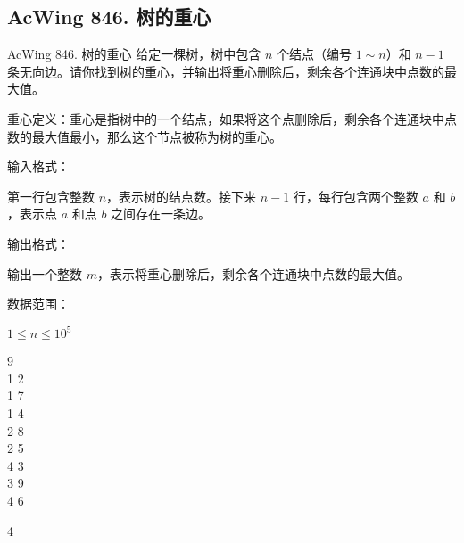 \subsection{AcWing 846. 树的重心}
\begin{titledbox}{AcWing 846. 树的重心}
    给定一棵树，树中包含 $n$ 个结点（编号 $1 \sim n$）和 $n-1$ 条无向边。请你找到树的重心，并输出将重心删除后，剩余各个连通块中点数的最大值。

    重心定义：重心是指树中的一个结点，如果将这个点删除后，剩余各个连通块中点数的最大值最小，那么这个节点被称为树的重心。

    输入格式：

    第一行包含整数 $n$，表示树的结点数。接下来 $n-1$ 行，每行包含两个整数 $a$ 和 $b$，表示点 $a$ 和点 $b$ 之间存在一条边。

    输出格式：

    输出一个整数 $m$，表示将重心删除后，剩余各个连通块中点数的最大值。

    数据范围：

    $1 \le n \le 10^5$

    \begin{inputblock}
        9 \\
        1 2 \\
        1 7 \\
        1 4 \\
        2 8 \\
        2 5 \\
        4 3 \\
        3 9 \\
        4 6
    \end{inputblock}
    \begin{outputblock}
        4
    \end{outputblock}
\end{titledbox}

